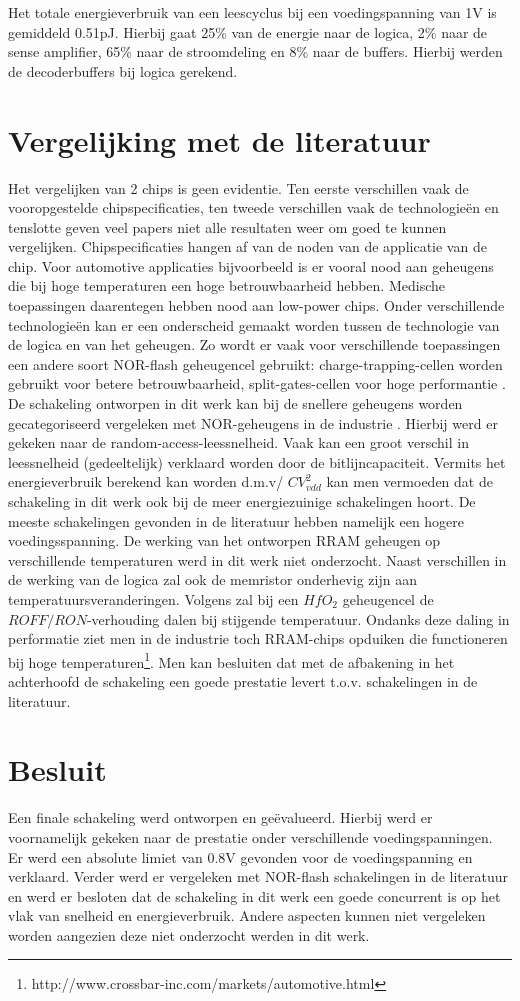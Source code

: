 Het totale energieverbruik van een leescyclus bij een voedingspanning van 1V is gemiddeld 0.51pJ. Hierbij gaat 25\% van de energie naar de logica, 2\% naar de sense amplifier, 65\% naar de stroomdeling en 8\% naar de buffers. Hierbij werden de decoderbuffers bij logica gerekend.

\section{Vergelijking met de literatuur}
Het vergelijken van 2 chips is geen evidentie. Ten eerste verschillen vaak de vooropgestelde chipspecificaties, ten tweede verschillen vaak de technologieën en tenslotte geven veel papers niet alle resultaten weer om goed te kunnen vergelijken. Chipspecificaties hangen af van de noden van de applicatie van de chip. Voor automotive applicaties bijvoorbeeld is er vooral nood aan geheugens die bij hoge temperaturen een hoge betrouwbaarheid hebben. Medische toepassingen daarentegen hebben  nood aan low-power chips. Onder verschillende technologieën kan er een onderscheid gemaakt worden tussen de technologie van de logica en van het geheugen. Zo wordt er vaak voor verschillende toepassingen een andere soort NOR-flash geheugencel gebruikt: charge-trapping-cellen worden gebruikt voor betere betrouwbaarheid, split-gates-cellen voor hoge performantie \cite{5783209}. De schakeling ontworpen in dit werk kan bij de snellere geheugens worden gecategoriseerd vergeleken met NOR-geheugens in de industrie \cite{6649105}\cite{4433985}\cite{4027813}. Hierbij werd er gekeken naar de random-access-leessnelheid. Vaak kan een groot verschil in leessnelheid (gedeeltelijk) verklaard worden door de bitlijncapaciteit. Vermits het energieverbruik berekend kan worden d.m.v/ $CV_{vdd}^{2}$ kan men vermoeden dat de schakeling in dit werk ook bij de meer energiezuinige schakelingen hoort. De meeste schakelingen gevonden in de literatuur hebben namelijk een hogere voedingsspanning. De werking van het ontworpen RRAM geheugen op verschillende temperaturen werd in dit werk niet onderzocht. Naast verschillen in de werking van de logica zal ook de memristor onderhevig zijn aan temperatuursveranderingen. Volgens \cite{5948374} zal bij een $HfO_{2}$ geheugencel de $ROFF/RON$-verhouding dalen bij stijgende temperatuur. Ondanks deze daling in performatie ziet men in de industrie toch RRAM-chips opduiken die functioneren bij hoge temperaturen\footnote{http://www.crossbar-inc.com/markets/automotive.html}. Men kan besluiten dat met de afbakening in het achterhoofd de schakeling een goede prestatie levert t.o.v. schakelingen in de literatuur.

\section{Besluit}
Een finale schakeling werd ontworpen en geëvalueerd. Hierbij werd er voornamelijk gekeken naar de prestatie onder verschillende voedingspanningen. Er werd een absolute limiet van 0.8V gevonden voor de voedingspanning en verklaard. Verder werd er vergeleken met NOR-flash schakelingen in de literatuur en werd er besloten dat de schakeling in dit werk een goede concurrent is op het vlak van snelheid en energieverbruik. Andere aspecten kunnen niet vergeleken worden aangezien deze niet onderzocht werden in dit werk.